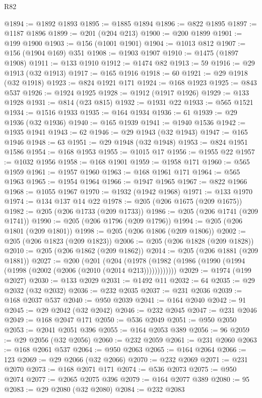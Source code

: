 \begin{lexlean}{R82}
\begin{coremodule}
@1894 := @1892 @1893
@1895 := @1885 @1894
@1896 := @822 @1895
@1897 := @1187 @1896
@1899 := @201 (@204 @213)
@1900 := @200 @1899
@1901 := @199 @1900
@1903 := @156 (@1001 @1901)
@1904 := @1013 @812
@1907 := @156 (@1904 @169) @351
@1908 := @1903 @1907
@1910 := @1475 (@1897 @1908)
@1911 := @133 @1910
@1912 := @1474 @82
@1913 := 59
@1916 := @29 @1913 (@32 @1913)
@1917 := @165 @1916
@1918 := 60
@1921 := @29 @1918 (@32 @1918)
@1923 := @824 @1921 @171
@1924 := @168 @1923
@1925 := @843 @537
@1926 := @1924 @1925
@1928 := @1912 (@1917 @1926)
@1929 := @133 @1928
@1931 := @814 (@23 @815)
@1932 := @1931 @22
@1933 := @565 @1521
@1934 := @1516 @1933
@1935 := @164 @1934
@1936 := 61
@1939 := @29 @1936 (@32 @1936)
@1940 := @165 @1939
@1941 := @1940 @1536
@1942 := @1935 @1941
@1943 := 62
@1946 := @29 @1943 (@32 @1943)
@1947 := @165 @1946
@1948 := 63
@1951 := @29 @1948 (@32 @1948)
@1953 := @824 @1951 @1586
@1954 := @168 @1953
@1955 := @1015 @17
@1956 := @1955 @22
@1957 := @1032 @1956
@1958 := @168 @1901
@1959 := @1958 @171
@1960 := @565 @1959
@1961 := @1957 @1960
@1963 := @168 @1961 @171
@1964 := @565 @1963
@1965 := @1954 @1964
@1966 := @1947 @1965
@1967 := @822 @1966
@1968 := @1055 @1967
@1970 := @1932 (@1942 @1968)
@1971 := @133 @1970
@1974 := @134 @137 @14 @22
@1978 := @205 (@206 @1675 (@209 @1675))
@1982 := @205 (@206 @1733 (@209 @1733))
@1986 := @205 (@206 @1741 (@209 @1741))
@1990 := @205 (@206 @1796 (@209 @1796))
@1994 := @205 (@206 @1801 (@209 @1801))
@1998 := @205 (@206 @1806 (@209 @1806))
@2002 := @205 (@206 @1823 (@209 @1823))
@2006 := @205 (@206 @1828 (@209 @1828))
@2010 := @205 (@206 @1862 (@209 @1862))
@2014 := @205 (@206 @1881 (@209 @1881))
@2027 := @200
    (@201
      (@204 (@1978 (@1982 (@1986 (@1990 (@1994 (@1998 (@2002 (@2006 (@2010 (@2014 @213))))))))))))
@2029 := @1974 (@199 @2027)
@2030 := @133 @2029
@2031 := @1492 @11
@2032 := 64
@2035 := @29 @2032 (@32 @2032)
@2036 := @232 @2035
@2037 := @231 @2036
@2039 := @168 @2037 @537
@2040 := @950 @2039
@2041 := @164 @2040
@2042 := 91
@2045 := @29 @2042 (@32 @2042)
@2046 := @232 @2045
@2047 := @231 @2046
@2049 := @168 @2047 @171
@2050 := @536 @2049
@2051 := @950 @2050
@2053 := @2041 @2051 @396
@2055 := @164 @2053 @389
@2056 := 96
@2059 := @29 @2056 (@32 @2056)
@2060 := @232 @2059
@2061 := @231 @2060
@2063 := @168 @2061 @537
@2064 := @950 @2063
@2065 := @164 @2064
@2066 := 123
@2069 := @29 @2066 (@32 @2066)
@2070 := @232 @2069
@2071 := @231 @2070
@2073 := @168 @2071 @171
@2074 := @536 @2073
@2075 := @950 @2074
@2077 := @2065 @2075 @396
@2079 := @164 @2077 @389
@2080 := 95
@2083 := @29 @2080 (@32 @2080)
@2084 := @232 @2083

\end{coremodule}
\end{lexlean}
